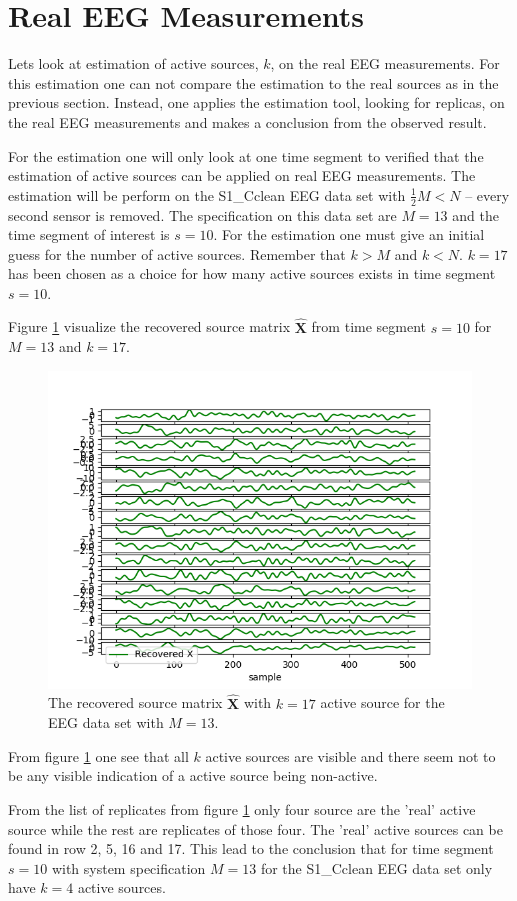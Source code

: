 \section{Real EEG Measurements}
Lets look at estimation of active sources, $k$, on the real EEG measurements. 
For this estimation one can not compare the estimation to the real sources as in the previous section.
Instead, one applies the estimation tool, looking for replicas, on the real EEG measurements and makes a conclusion from the observed result.

For the estimation one will only look at one time segment to verified that the estimation of active sources can be applied on real EEG measurements. The estimation will be perform on the S1\_Cclean EEG data set with $\frac{1}{2} M < N$ -- every second sensor is removed. The specification on this data set are $M=13$ and the time segment of interest is $s = 10$. 
For the estimation one must give an initial guess for the number of active sources. Remember that $k>M$ and $k<N$.  
$k = 17$ has been chosen as a choice for how many active sources exists in time segment $s = 10$. 

Figure \ref{fig:eeg_k} visualize the recovered source matrix $\hat{\mathbf{X}}$ from time segment $s=10$ for $M=13$ and $k = 17$.
\begin{figure}[H]
    \centering
	\includegraphics[scale=0.5]{figures/ch_estimate/eeg_k_timeseg_10.png}
	\caption{The recovered source matrix $\hat{\mathbf{X}}$ with $k=17$ active source for the EEG data set with $M=13$.}
	\label{fig:eeg_k}
\end{figure}
\noindent
From figure \ref{fig:eeg_k} one see that all $k$ active sources are visible and there seem not to be any visible indication of a active source being non-active. 

From the list of replicates from figure \ref{fig:eeg_k} only four source are the 'real' active source while the rest are replicates of those four. The 'real' active sources can be found in row 2, 5, 16 and 17. This lead to the conclusion that for time segment $s=10$ with system specification $M=13$ for the  S1\_Cclean EEG data set only have $k=4$ active sources.



